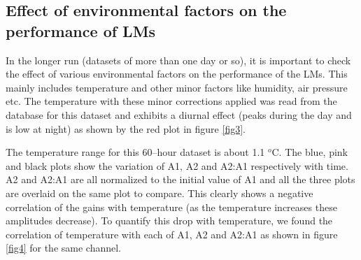 \documentclass[article,accept,moreauthors,pdftex,10pt,a4paper]{Definitions/mdpi}
\begin{document}
\subsection{Effect of environmental factors on the performance of LMs}
In the longer run (datasets of more than one day or so), it is important to check the effect of 
various environmental factors on the performance of the LMs. This mainly includes temperature and 
other minor factors like humidity, air pressure etc. The temperature with these minor corrections applied 
was read from the database for this dataset and exhibits a diurnal effect (peaks during the day and is low at night) 
as shown by the red plot in figure \ref{fig3}. 

The temperature range for this 60--hour dataset is about 1.1 $^o$C. The blue, pink and black plots show the variation of 
A1, A2 and A2:A1 respectively with time. A2 and A2:A1 are all normalized to the initial 
value of A1 and all the three plots are overlaid on the same plot to compare. 
This clearly shows a negative correlation of the gains with temperature (as the 
temperature increases these amplitudes decrease). To quantify this drop with temperature, we found the correlation of 
temperature with each of A1, A2 and A2:A1 as shown in figure \ref{fig4} for the same channel.
\end{document}
